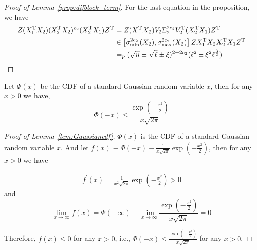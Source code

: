 \begin{proof}[Proof of Lemma~\ref{prop:difblock_term}]
For the last equation in the proposition, we have
\begin{equation}
\begin{split}
    Z(X_1^{\mathrm{T}}X_2)(X_2^{\mathrm{T}}X_2)^{c_2}(X_2^{\mathrm{T}}X_1) Z^{\mathrm{T}}
    &= Z(X_1^{\mathrm{T}}X_2)V_2\Sigma^{2c_2}_2V_2^{\mathrm{T}}(X_2^{\mathrm{T}}X_1) Z^{\mathrm{T}}      \\ 
    &\in \left[\sigma^{2c_2}_{\min}(X_2),\sigma^{2c_2}_{\max}(X_2) \right] Z X_1^{\mathrm{T}}X_2X_2^{\mathrm{T}}X_1 Z^{\mathrm{T}}    \\ 
    &=_p (\sqrt n \pm \sqrt \ell \pm \xi)^{2+2c_2}(\ell^{2} \pm \xi^2 \ell^{\frac{3}{2}})
\end{split}
\end{equation}
\end{proof}

\begin{lemma} \label{lem:Gaussiancdf}
Let $\Phi(x)$ be the CDF of a standard Gaussian random variable $x$, then for any $x>0$ we have,
\begin{equation}
    \Phi(-x) \leq \frac{\exp \left( -\frac{x^2}{2}\right)}{x \sqrt{2\pi} }
\end{equation}
\end{lemma}

\begin{proof}[Proof of Lemma~\ref{lem:Gaussiancdf}]
$\Phi(x)$ is the CDF of a standard Gaussian random variable $x$. And let $f(x) \equiv \Phi(-x) - \frac{1}{x \sqrt{2\pi} }\exp \left( -\frac{x^2}{2}\right)$, then for any $x>0$ we have

\begin{equation}
\begin{split}
f^{\prime}(x) = \frac{1}{x^2 \sqrt{2\pi} }\exp \left( -\frac{x^2}{2}\right)> 0
\end{split}
\end{equation}
and
\begin{equation}
    \lim_{x \to \infty} f(x)= \Phi(-\infty) - \lim_{x \to \infty} \frac{\exp \left( -\frac{x^2}{2}\right)}{x \sqrt{2\pi} }= 0
\end{equation}

Therefore, $f(x) \leq 0$ for any $x>0$, i.e., $\Phi(-x) \leq \frac{\exp \left( -\frac{x^2}{2}\right)}{x \sqrt{2\pi} }$ for any $x>0$.
\end{proof}


